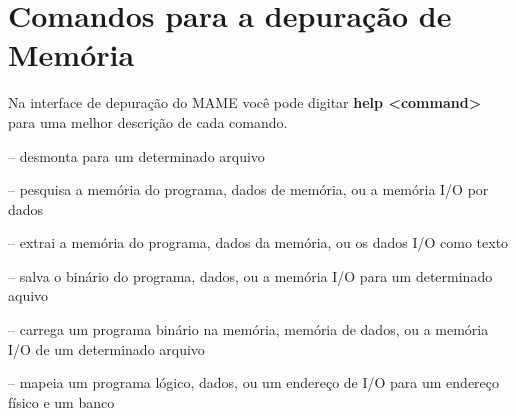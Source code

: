 \documentclass[letterpaper,10pt,brazil]{sphinxmanual}
\begin{document}
\section{Comandos para a depuração de Memória}
\label{debugger/memory:debugger-memory-list}\label{debugger/memory::doc}\label{debugger/memory:comandos-para-a-depuracao-de-memoria}
Na interface de depuração do MAME você pode digitar \textbf{help \textless{}command\textgreater{}}
para uma melhor descrição de cada comando.

\begin{DUlineblock}{0em}
\item[] {\hyperref[debugger/memory:debugger\string-command\string-dasm]{}} -- desmonta para um determinado arquivo
\item[] {\hyperref[debugger/memory:debugger\string-command\string-find]{}} -- pesquisa a memória do programa, dados de memória, ou a memória I/O por dados
\item[] {\hyperref[debugger/memory:debugger\string-command\string-dump]{}} -- extrai a memória do programa, dados da memória, ou os dados I/O como texto
\item[] {\hyperref[debugger/memory:debugger\string-command\string-save]{}} -- salva o binário do programa, dados, ou a memória I/O para um determinado aquivo
\item[] {\hyperref[debugger/memory:debugger\string-command\string-load]{}} -- carrega um programa binário na memória, memória de dados, ou a memória I/O de um determinado arquivo
\item[] {\hyperref[debugger/memory:debugger\string-command\string-map]{}} -- mapeia um programa lógico, dados, ou um endereço de I/O para um endereço físico e um banco
\end{DUlineblock}
\begin{quote}
\label{debugger/memory:debugger-command-dasm}\end{quote}
\end{document}
